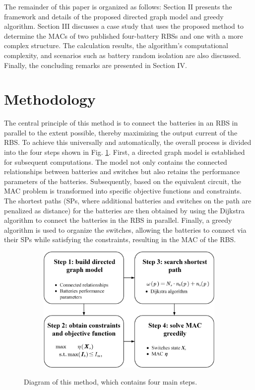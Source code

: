\documentclass{article}
\begin{document}
The remainder of this paper is organized as follows: 
Section II presents the framework and details of the proposed directed graph model and greedy algorithm. 
Section III discusses a case study that uses the proposed method to determine the MACs of two published four-battery RBSs and one with a more complex structure. 
The calculation results, the algorithm's computational complexity, and scenarios such as battery random isolation are also discussed. 
Finally, the concluding remarks are presented in Section IV.

\section{Methodology}

The central principle of this method is to connect the batteries in an RBS in parallel to the extent possible, thereby maximizing the output current of the RBS.
To achieve this universally and automatically, the overall process is divided into the four steps shown in Fig. \ref{fig:main}.
First, a directed graph model is established for subsequent computations. The model not only contains the connected relationships between batteries and switches but also retains the performance parameters of the batteries.
Subsequently, based on the equivalent circuit, the MAC problem is transformed into specific objective functions and constraints.
The shortest paths (SPs, where additional batteries and switches on the path are penalized as distance) for the batteries are then obtained  by using the Dijkstra algorithm to connect the batteries in the RBS in parallel.
Finally, a greedy algorithm is used to organize the switches, allowing the batteries to connect via their SPs while satisfying the constraints, resulting in the MAC of the RBS.

\begin{figure}[htbp]
    \centering
    \begin{subfigure}[b]{0.8\textwidth}
        \includegraphics[width=\textwidth]{main.png}
    \end{subfigure}
    \caption{ 
        Diagram of this method, which contains four main steps.
    }
    \label{fig:main}
\end{figure}
\end{document}
